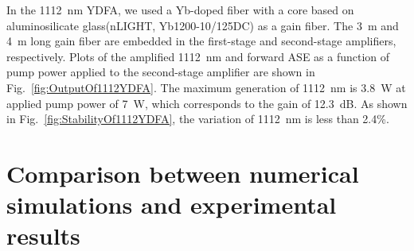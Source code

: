 \documentclass{osa-article}
\begin{document}
In the \SI{1112}{\nm} YDFA, we used a Yb-doped fiber with a core based on aluminosilicate glass(nLIGHT, Yb1200-10/125DC) as a gain fiber.
The \SI{3}{\m} and \SI{4}{\m} long gain fiber are embedded in the first-stage and second-stage amplifiers, respectively.
Plots of the amplified \SI{1112}{nm} and forward ASE as a function of pump power applied to the second-stage amplifier are shown in Fig.~\ref{fig:OutputOf1112YDFA}.
The maximum generation of \SI{1112}{\nm} is \SI{3.8}{\W} at applied pump power of \SI{7}{\W}, which corresponds to the gain of \SI{12.3}{\dB}.
As shown in Fig.~\ref{fig:StabilityOf1112YDFA}, the variation of \SI{1112}{\nm} is less than 2.4\%.

\section{Comparison between numerical simulations and experimental results} \label{sec:Discussion}
\end{document}
